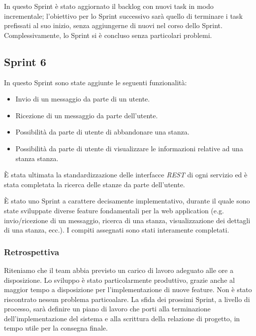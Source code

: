 In questo Sprint è stato aggiornato il backlog con nuovi task in modo incrementale; l'obiettivo per lo Sprint successivo sarà quello di terminare i task prefissati al suo inizio, senza aggiungerne di nuovi nel corso dello Sprint.
Complessivamente, lo Sprint si è concluso senza particolari problemi.

\subsection{Sprint 6}

In questo Sprint sono state aggiunte le seguenti funzionalità:

\begin{itemize}
%
    \item Invio di un messaggio da parte di un utente.
%
    \item Ricezione di un messaggio da parte dell'utente.
%
    \item Possibilità da parte di utente di abbandonare una stanza.
%
    \item Possibilità da parte di utente di visualizzare le informazioni relative ad una stanza stanza.
%
\end{itemize}

\`E stata ultimata la standardizzazione delle interfacce \textit{REST} di ogni servizio ed è stata completata la ricerca delle stanze da parte dell'utente.

È stato uno Sprint a carattere decisamente implementativo, durante il quale sono state sviluppate diverse feature fondamentali per la web application (e.g. invio/ricezione di un messaggio, ricerca di una stanza, visualizzazione dei dettagli di una stanza, ecc.).
I compiti assegnati sono stati interamente completati.

\subsubsection{Retrospettiva}

Riteniamo che il team abbia previsto un carico di lavoro adeguato alle ore a disposizione. Lo sviluppo è stato particolarmente produttivo, grazie anche al maggior tempo a disposizione per l'implementazione di nuove feature.
Non è stato riscontrato nessun problema particoalare. La sfida dei prossimi Sprint, a livello di processo, sarà definire un piano di lavoro che porti alla terminazione dell'implementazione del sistema e alla scrittura della relazione di progetto, in tempo utile per la consegna finale.

